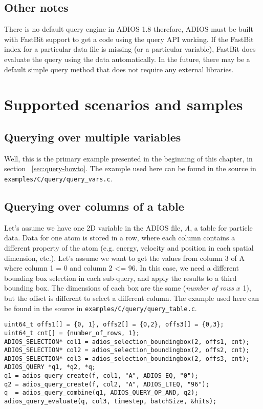 \subsection{Other notes}
There is no default query engine in ADIOS 1.8 therefore, ADIOS must be built with FastBit support to get a code using the query API working. If the FastBit index for a particular data file is missing (or a particular variable), FastBit does evaluate the query using the data automatically. In the future, there may be a default simple query method that does not require any external libraries.


%
%
\section{Supported scenarios and samples}


\subsection{Querying over multiple variables}
Well, this is the primary example presented in the beginning of this chapter, in section ~\ref{sec:query-howto}. The example used here can be found in the source in \verb+examples/C/query/query_vars.c+.

\subsection{Querying over columns of a table}
\label{sec:query-example-columns}
Let's assume we have one 2D variable in the ADIOS file, \emph{A}, a table for particle data. Data for one atom is stored in a row, where each column contains a different property of the atom (e.g. energy, velocity and position in each spatial dimension, etc.).
Let's assume we want to get the values from column 3 of A where column 1 = 0 and  column 2 <= 96.
In this case, we need a different bounding box selection in each sub-query, and apply the results to a third bounding box. The dimensions of each box are the same (\emph{number of rows} $x$ 1), but the offset is different to select a different column. The example used here can be found in the source in \verb+examples/C/query/query_table.c+.

\begin{lstlisting}[alsolanguage=C,
                             caption={Query over the columns of a table}, label=code:query_columns]
uint64_t offs1[] = {0, 1}, offs2[] = {0,2}, offs3[] = {0,3};
uint64_t cnt[] = {number_of_rows, 1};  
ADIOS_SELECTION* col1 = adios_selection_boundingbox(2, offs1, cnt);
ADIOS_SELECTION* col2 = adios_selection_boundingbox(2, offs2, cnt);
ADIOS_SELECTION* col3 = adios_selection_boundingbox(2, offs3, cnt);
ADIOS_QUERY *q1, *q2, *q;
q1 = adios_query_create(f, col1, "A", ADIOS_EQ, "0");
q2 = adios_query_create(f, col2, "A", ADIOS_LTEQ, "96");
q  = adios_query_combine(q1, ADIOS_QUERY_OP_AND, q2);
adios_query_evaluate(q, col3, timestep, batchSize, &hits);

\end{lstlisting}




